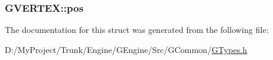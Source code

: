\subsubsection[{pos}]{ G\+V\+E\+R\+T\+E\+X\+::pos}\label{struct_g_v_e_r_t_e_x_adb54d5a107adc1d3d4ac6012b4694d21}


The documentation for this struct was generated from the following file\+:\begin{DoxyCompactItemize}
\item 
D\+:/\+My\+Project/\+Trunk/\+Engine/\+G\+Engine/\+Src/\+G\+Common/\hyperlink{_g_types_8h}{G\+Types.\+h}\end{DoxyCompactItemize}
